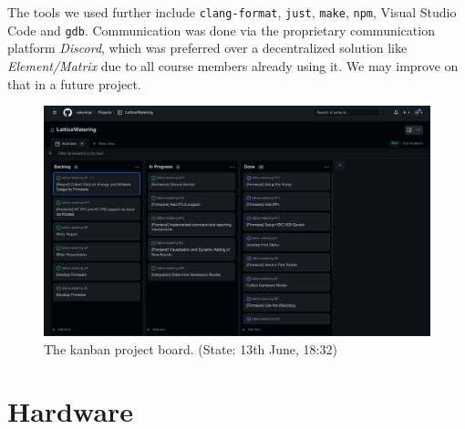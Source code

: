 \documentclass[acmtog, language=english, nonacm]{acmart}
\begin{document}
    The tools we used further include \texttt{clang-format}, \texttt{just}, \texttt{make}, \texttt{npm}, Visual Studio Code and \texttt{gdb}. Communication was done via the proprietary communication platform \emph{Discord}, which was preferred over a decentralized solution like \emph{Element/Matrix} due to all course members already using it. We may improve on that in a future project.

    \begin{figure}[!hbtp]
        \centering
        \includegraphics[width=\linewidth]{img/kanban_board.png}
        \caption{The kanban project board. (State: 13th June, 18:32)}
        \label{fig:kanban_board}
    \end{figure}

    \label{sec:hardware} \section{Hardware}
\end{document}
